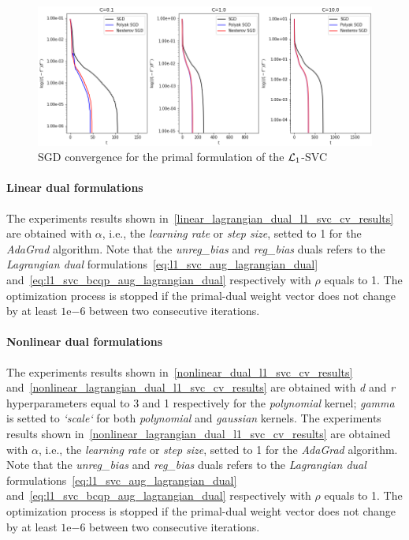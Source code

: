 

\begin{figure}[H]
	\centering
	\includegraphics[scale=0.55]{img/l1_svc_loss_history}
	\caption{SGD convergence for the primal formulation of the $\protect \mathcal{L}_1$-SVC}
	\label{fig:l1_svc_loss_history}
\end{figure}

\paragraph{Linear dual formulations}

The experiments results shown in~\ref{linear_lagrangian_dual_l1_svc_cv_results} are obtained with $\alpha$, i.e., the \emph{learning rate} or \emph{step size}, setted to 1 for the \emph{AdaGrad} algorithm. Note that the \emph{unreg\_bias} and \emph{reg\_bias} duals refers to the \emph{Lagrangian dual} formulations~\eqref{eq:l1_svc_aug_lagrangian_dual} and~\eqref{eq:l1_svc_bcqp_aug_lagrangian_dual} respectively with $\rho$ equals to 1. The optimization process is stopped if the primal-dual weight vector does not change by at least $1\mathrm{e}{-6}$  between two consecutive iterations.





\paragraph{Nonlinear dual formulations}

The experiments results shown in~\ref{nonlinear_dual_l1_svc_cv_results} and~\ref{nonlinear_lagrangian_dual_l1_svc_cv_results} are obtained with \emph{d} and \emph{r} hyperparameters equal to 3 and 1 respectively for the \emph{polynomial} kernel; \emph{gamma} is setted to \emph{`scale`} for both \emph{polynomial} and \emph{gaussian} kernels. The experiments results shown in~\ref{nonlinear_lagrangian_dual_l1_svc_cv_results} are obtained with $\alpha$, i.e., the \emph{learning rate} or \emph{step size}, setted to 1 for the \emph{AdaGrad} algorithm. Note that the \emph{unreg\_bias} and \emph{reg\_bias} duals refers to the \emph{Lagrangian dual} formulations~\eqref{eq:l1_svc_aug_lagrangian_dual} and~\eqref{eq:l1_svc_bcqp_aug_lagrangian_dual} respectively with $\rho$ equals to 1. The optimization process is stopped if the primal-dual weight vector does not change by at least $1\mathrm{e}{-6}$  between two consecutive iterations.

